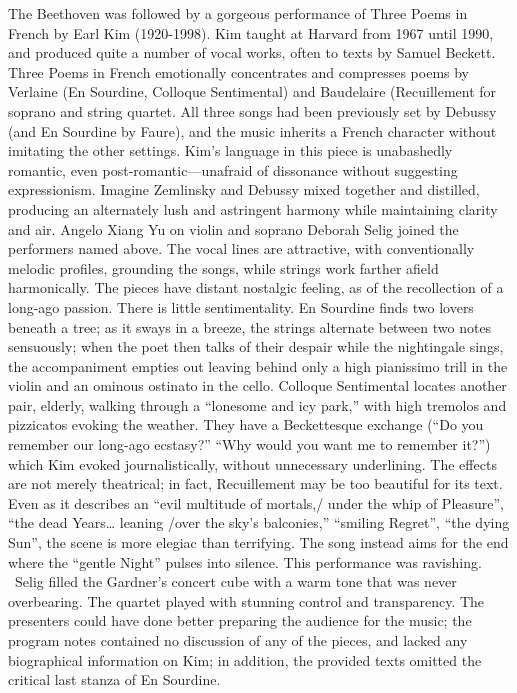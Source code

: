 The Beethoven was followed by a gorgeous performance of Three Poems in French by Earl Kim (1920-1998). Kim taught at Harvard from 1967 until 1990, and produced quite a number of vocal works, often to texts by Samuel Beckett. Three Poems in French emotionally concentrates and compresses poems by Verlaine (En Sourdine, Colloque Sentimental) and Baudelaire (Recuillement for soprano and string quartet. All three songs had been previously set by Debussy (and En Sourdine by Faure), and the music inherits a French character without imitating the other settings. Kim’s language in this piece is unabashedly romantic, even post-romantic—unafraid of dissonance without suggesting expressionism. Imagine Zemlinsky and Debussy mixed together and distilled, producing an alternately lush and astringent harmony while maintaining clarity and air. Angelo Xiang Yu on violin and soprano Deborah Selig joined the performers named above. The vocal lines are attractive, with conventionally melodic profiles, grounding the songs, while strings work farther afield harmonically. The pieces have distant nostalgic feeling, as of the recollection of a long-ago passion. There is little sentimentality. En Sourdine finds two lovers beneath a tree; as it sways in a breeze, the strings alternate between two notes sensuously; when the poet then talks of their despair while the nightingale sings, the accompaniment empties out leaving behind only a high pianissimo trill in the violin and an ominous ostinato in the cello. Colloque Sentimental locates another pair, elderly, walking through a “lonesome and icy park,” with high tremolos and pizzicatos evoking the weather. They have a Beckettesque exchange (“Do you remember our long-ago ecstasy?” “Why would you want me to remember it?”) which Kim evoked journalistically, without unnecessary underlining. The effects are not merely theatrical; in fact, Recuillement may be too beautiful for its text. Even as it describes an “evil multitude of mortals,/ under the whip of Pleasure”, “the dead Years… leaning /over the sky’s balconies,” “smiling Regret”, “the dying Sun”, the scene is more elegiac than terrifying. The song instead aims for the end where the “gentle Night” pulses into silence. This performance was ravishing.  Selig filled the Gardner’s concert cube with a warm tone that was never overbearing. The quartet played with stunning control and transparency. The presenters could have done better preparing the audience for the music; the program notes contained no discussion of any of the pieces, and lacked any biographical information on Kim; in addition, the provided texts omitted the critical last stanza of En Sourdine.

